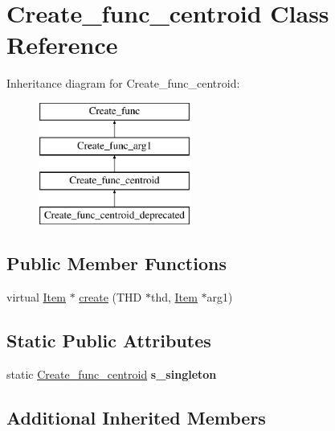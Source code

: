 \hypertarget{classCreate__func__centroid}{}\section{Create\+\_\+func\+\_\+centroid Class Reference}
\label{classCreate__func__centroid}
Inheritance diagram for Create\+\_\+func\+\_\+centroid\+:\begin{figure}[H]
\begin{center}
\leavevmode
\includegraphics[height=4.000000cm]{classCreate__func__centroid}
\end{center}
\end{figure}
\subsection*{Public Member Functions}
\begin{DoxyCompactItemize}
\item 
virtual \mbox{\hyperlink{classItem}{Item}} $\ast$ \mbox{\hyperlink{classCreate__func__centroid_aef4565161680a1ea2f730eb9a7a5ab3b}{create}} (T\+HD $\ast$thd, \mbox{\hyperlink{classItem}{Item}} $\ast$arg1)
\end{DoxyCompactItemize}
\subsection*{Static Public Attributes}
\begin{DoxyCompactItemize}
\item 
\mbox{\label{classCreate__func__centroid_a7a79d33ba9a8dcca2f8326b521440776}} 
static \mbox{\hyperlink{classCreate__func__centroid}{Create\+\_\+func\+\_\+centroid}} {\bfseries s\+\_\+singleton}
\end{DoxyCompactItemize}
\subsection*{Additional Inherited Members}


